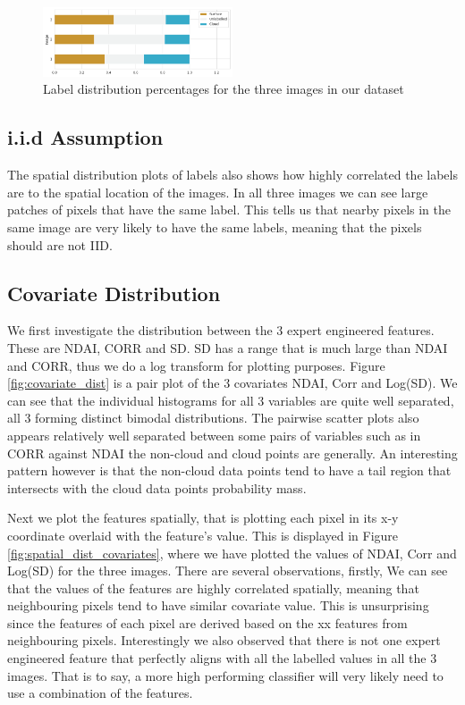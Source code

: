 \documentclass[11pt, letterpaper, journal]{IEEEtran}
\begin{document}
\begin{figure}[!h]
\centering
\includegraphics[width=0.5\textwidth]{statics/2.a.png}
\caption{Label distribution percentages for the three images in our dataset}
\label{fig:label_dist}
\end{figure}

\subsection{i.i.d Assumption}
The spatial distribution plots of labels also shows how highly correlated the labels are to the spatial location of the images. In all three images we can see large patches of pixels that have the same label. This tells us that nearby pixels in the same image are very likely to have the same labels, meaning that the pixels should are not IID.

\subsection{Covariate Distribution}
We first investigate the distribution between the 3 expert engineered features. These are NDAI, CORR and SD. SD has a range that is much large than NDAI and CORR, thus we do a log transform for plotting purposes. Figure \ref{fig:covariate_dist} is a pair plot of the 3 covariates NDAI, Corr and Log(SD). We can see that the individual histograms for all 3 variables are quite well separated, all 3 forming distinct bimodal distributions. The pairwise scatter plots also appears relatively well separated between some pairs of variables such as in CORR against NDAI the non-cloud and cloud points are generally. An interesting pattern however is that the non-cloud data points tend to have a tail region that intersects with the cloud data points probability mass.

Next we plot the features spatially, that is plotting each pixel in its x-y coordinate overlaid with the feature's value. This is displayed in Figure \ref{fig:spatial_dist_covariates}, where we have plotted the values of NDAI, Corr and Log(SD) for the three images. There are several observations, firstly, We can see that the values of the features are highly correlated spatially, meaning that neighbouring pixels tend to have similar covariate value. This is unsurprising since the features of each pixel are derived based on the xx features from neighbouring pixels. Interestingly we also observed that there is not one expert engineered feature that perfectly aligns with all the labelled values in all the 3 images. That is to say, a more high performing classifier will very likely need to use a combination of the features.
\end{document}
